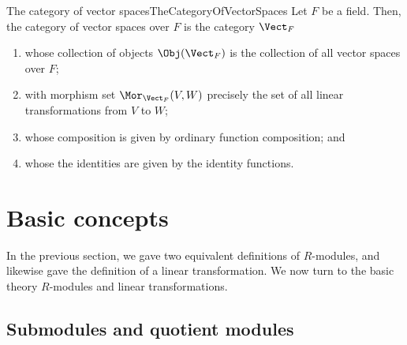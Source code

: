 \begin{exm}{The category of vector spaces}{TheCategoryOfVectorSpaces}
Let $F$ be a field.  Then, the category of vector spaces over $F$ is the category $\Vect _F$
\begin{enumerate}
\item whose collection of objects $\Obj (\Vect _F )$ is the collection of all vector spaces over $F$;
\item with morphism set $\Mor _{\Vect _F}(V,W)$ precisely the set of all linear transformations from $V$ to $W$;
\item whose composition is given by ordinary function composition; and
\item whose the identities are given by the identity functions.
\end{enumerate}
\end{exm}

\section{Basic concepts}

In the previous section, we gave two equivalent definitions of $R$-modules, and likewise gave the definition of a linear transformation.  We now turn to the basic theory $R$-modules and linear transformations.

\subsection{Submodules and quotient modules}

